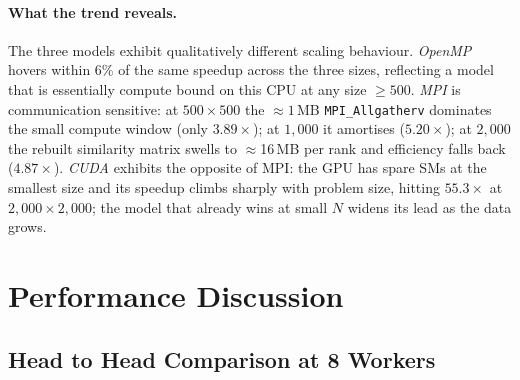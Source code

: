 \documentclass[11pt,a4paper]{article}
\newcommand{\code}[1]{\texttt{\small #1}}
\begin{document}
\paragraph{What the trend reveals.} The three models exhibit qualitatively
different scaling behaviour. \emph{OpenMP} hovers within 6\% of the same
speedup across the three sizes, reflecting a model that is essentially
compute bound on this CPU at any size $\geq 500$. \emph{MPI} is communication
sensitive: at $500\times500$ the $\approx 1$\,MB \code{MPI\_Allgatherv}
dominates the small compute window (only $3.89\times$); at $1{,}000$ it
amortises ($5.20\times$); at $2{,}000$ the rebuilt similarity matrix swells to
$\approx$16\,MB per rank and efficiency falls back ($4.87\times$). \emph{CUDA}
exhibits the opposite of MPI: the GPU has spare SMs at the smallest size and
its speedup climbs sharply with problem size, hitting $55.3\times$ at
$2{,}000\times2{,}000$; the model that already wins at small $N$ widens
its lead as the data grows.

\section{Performance Discussion}\label{sec:discussion}

\subsection{Head to Head Comparison at 8 Workers}
\end{document}
